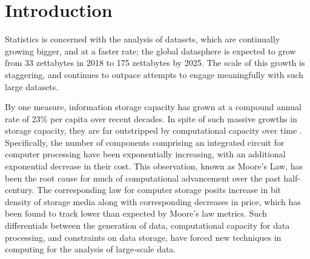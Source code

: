 \documentclass[a4paper,10pt]{article}
\begin{document}

\tableofcontents
\newpage
\section{Introduction}

Statistics is concerned with the analysis of datasets, which are continually growing bigger, and at a faster rate;
the global datasphere is expected to grow from 33 zettabytes in 2018 to 175 zettabytes by 2025\cite{rydning2018digitization}.
The scale of this growth is staggering, and continues to outpace attempts to engage meaningfully with such large datasets. 

By one measure, information storage capacity has grown at a compound annual rate of 23\% per capita over recent decades\cite{hilbert2011world}.
In spite of such massive growths in storage capacity, they are far outstripped by computational capacity over time \cite{fontana2018moore}.
Specifically, the number of components comprising an integrated circuit for computer processing have been exponentially increasing, with an additional exponential decrease in their cost\cite{moore1975progress}.
This observation, known as Moore's Law, has been the root cause for much of computational advancement over the past half-century.
The corresponding law for computer storage posits increase in bit density of storage media along with corresponding decreases in price, which has been found to track lower than expected by Moore's law metrics.
Such differentials between the generation of data, computational capacity for data processing, and constraints on data storage, have forced new techniques in computing for the analysis of large-scale data.\\
\end{document}
